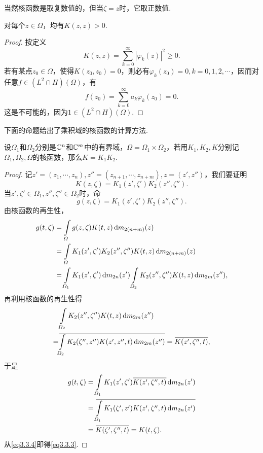 当然核函数是取复数值的，但当$\zeta=z$时，它取正数值.
\begin{prop}\label{prop3.3.4}
	对每个$z\in\Omega$，均有$K(z,z)>0$.
\end{prop}
\begin{proof}
	按定义
	\[K(z,z)=\sum_{k=0}^{\infty}|\varphi_k(z)|^2\ge0.\]
	若有某点$z_0\in\Omega$，使得$K(z_0,z_0)=0$，则必有$\varphi_k(z_0)=0,k=0,1,2,\cdots$，因而对任意$f\in(L^2\cap H)(\Omega)$，有
	\[f(z_0)=\sum_{k=0}^{\infty}a_k\varphi_k(z_0)=0.\]
	这是不可能的，因为$1\in(L^2\cap H)(\Omega)$.
\end{proof}
下面的命题给出了乘积域的核函数的计算方法.
\begin{prop}\label{prop3.3.5}
	设$\Omega_1$和$\Omega_2$分别是$\mathbb C^n$和$\mathbb C^m$中的有界域，$\Omega=\Omega_1\times\Omega_2$，若用$K_1,K_2,K$分别记$\Omega_1,\Omega_2,\Omega$的核函数，那么$K=K_1K_2$.
\end{prop}
\begin{proof}
	记$z'=(z_1,\cdots,z_n),z''=(z_{n+1},\cdots,z_{n+m}),z=(z',z'')$，我们要证明
	\begin{equation}\label{eq3.3.3}
		K(z,\zeta)=K_1(z',\zeta')K_2(z'',\zeta'').
	\end{equation}
当$z',\zeta'\in\Omega_1,z'',\zeta''\in\Omega_2$时，命
\begin{equation}\label{eq3.3.4}
	g(z,\zeta)=K_1(z',\zeta')K_2(z'',\zeta'').
\end{equation}
由核函数的再生性，
\begin{align*}
	g(t,\zeta)
	&=\int\limits_\varOmega g(z,\zeta)K(t,z)\mathop{}\!\mathrm{d} m_{2(n+m)}(z)\\
	&=\int\limits_\varOmega K_1(z',\zeta')K_2(z'',\zeta'')K(t,z)\mathop{}\!\mathrm{d} m_{2(n+m)}(z)\\
	&=\int\limits_{\varOmega_1} K_1(z',\zeta')\mathop{}\!\mathrm{d} m_{2n}(z')\int\limits_{\varOmega_2} K_2(z'',\zeta'')K(t,z)\mathop{}\!\mathrm{d} m_{2m}(z''),
\end{align*}
再利用核函数的再生性得
\begin{align*}
	&\int\limits_{\varOmega_2} K_2(z'',\zeta'')K(t,z)\mathop{}\!\mathrm{d} m_{2m}(z'')\\
	=&{}\mkern1mu\overline{\mkern-1mu\int\limits_{\varOmega_2} K_2(\zeta'',z'')K(z',z'',t)\mathop{}\!\mathrm{d} m_{2m}(z'')}={}\mkern1mu\overline{\mkern-1muK(z',\zeta'',t)},
\end{align*}
于是
\begin{align*}
	g(t,\zeta)
	&=\int\limits_{\varOmega_1} K_1(z',\zeta'){}\mkern1mu\overline{\mkern-1muK(z',\zeta'',t)}\mathop{}\!\mathrm{d} m_{2n}(z')\\
	&={}\mkern1mu\overline{\mkern-1mu\int\limits_{\varOmega_1} K_1(\zeta',z')K(z',\zeta'',t)\mathop{}\!\mathrm{d} m_{2n}(z')}\\
	&={}\mkern1mu\overline{\mkern-1muK(\zeta',\zeta'',t)}=K(t,\zeta).
\end{align*}
从\eqref{eq3.3.4}即得\eqref{eq3.3.3}.
\end{proof}
